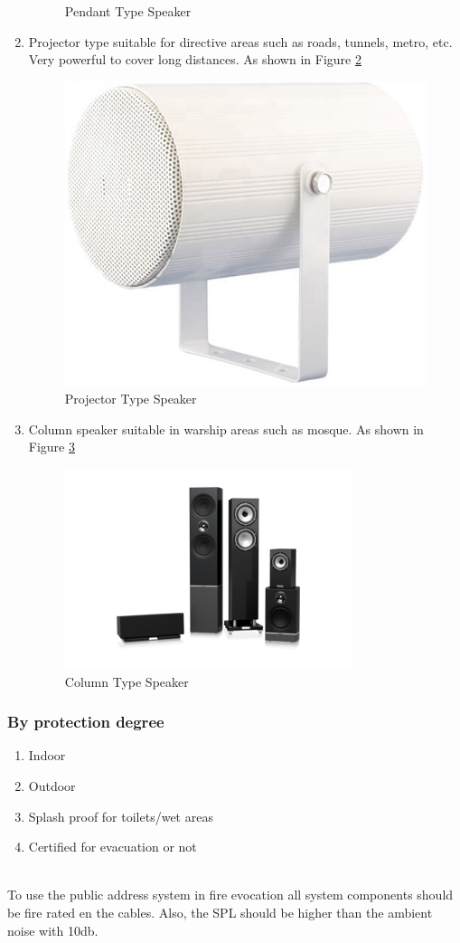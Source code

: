 \documentclass[12pt,fleqn]{book} %
\begin{document}
\begin{enumerate}
\begin{figure}[!h]
    \caption{Pendant Type Speaker}
    \label{fig:hamdy 69}
    \end{figure}
    \item Projector type suitable for directive areas such as roads, tunnels, metro, etc. Very powerful to cover long distances. As shown in Figure \ref{fig:hamdy 70}
          \begin{figure}[!h]
    \centering
    \includegraphics[width=0.5\linewidth]{hamdy 70.png}
    \caption{Projector Type Speaker}
    \label{fig:hamdy 70}
    \end{figure}
    \item Column speaker suitable in warship areas such as mosque. As shown in Figure \ref{fig:hamdy 71}
           \begin{figure}[!h]
    \centering
    \includegraphics[width=0.6\linewidth]{hamdy 71.png}
    \caption{Column Type Speaker}
    \label{fig:hamdy 71}
    \end{figure}
\end{enumerate}
\subsubsection{By protection degree}
\begin{enumerate}
    \item Indoor
    \item Outdoor
    \item Splash proof for toilets/wet areas
    \item Certified for evacuation or not
\end{enumerate}
\\ To use the public address system in fire evocation all system components should be fire rated en the cables. Also, the SPL should be higher than the ambient noise with 10db.
\end{document}
